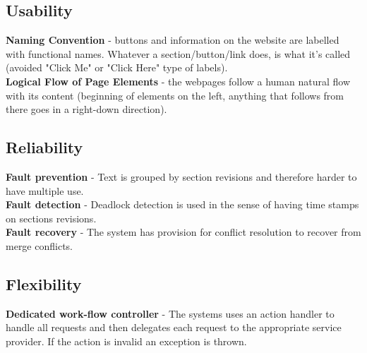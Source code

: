 \subsection{Usability}
\par{\textbf{Naming Convention} - buttons and information on the website are labelled with functional names. Whatever a section/button/link does, is what it's called (avoided "Click Me" or "Click Here" type of labels). \\\textbf{Logical Flow of Page Elements} - the webpages follow a human natural flow with its content (beginning of elements on the left, anything that follows from there goes in a right-down direction). }
\subsection{Reliability}
\par{\textbf{Fault prevention} - Text is grouped by section revisions and therefore harder to have multiple use. 
\\\textbf{Fault detection} - Deadlock detection is used in the sense of having time stamps on sections revisions.
\\\textbf{Fault recovery} - The system has provision for conflict resolution to recover from merge conflicts.
}
\subsection{Flexibility}
\par{\textbf{Dedicated work-flow controller} - The systems uses an action handler to handle all requests and then delegates each request to the appropriate service provider. If the action is invalid an exception is thrown.
}